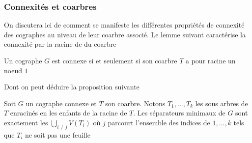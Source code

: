 \documentclass{scrartcl}
\begin{document}
\begin{flushleft}
\begin{figure}[h]
\begin{center}
    \end{center}
\end{figure}

\subsubsection{Connexités et coarbres}

On discutera ici de comment se manifeste les différentes propriétés de connexité des cographes au niveau de leur coarbre associé. Le lemme
suivant caractérise la connexité par la racine de du coarbre

\begin{lem}
    Un cographe $G$ est connexe si et seulement si son coarbre $T$ a pour racine un noeud $1$
\end{lem}

Dont on peut déduire la proposition suivante

\begin{prop}\label{sepcographe}
    Soit $G$ un cographe connexe et $T$ son coarbre. Notons $T_1, ..., T_k$ les sous arbres de $T$ enracinés en les enfants de la racine de $T$.
    Les séparateurs minimaux de $G$ sont exactement les $\displaystyle \bigcup_{i \neq j} V(T_i)$ où $j$ parcourt l'ensemble des indices de $1, ..., k$
    tels que $T_i$ ne soit pas une feuille
\end{prop}


\end{flushleft}
\end{document}
